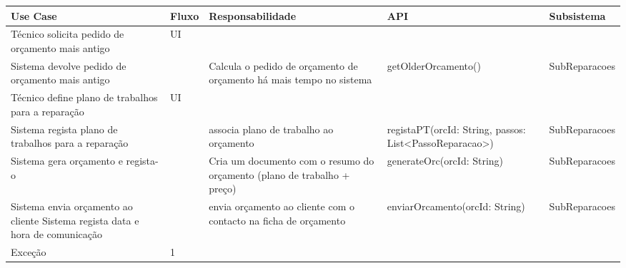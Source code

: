 \documentclass[../relatorio.tex]{subfiles}
\begin{document}
\begin{landscape}
    \begin{table}[!h]
        \centering
        \begin{tabular}{|p{5cm}|p{1cm}|p{4cm}|p{6cm}|p{3cm}|}
            \hline
            \rowcolor{gray!20!white}
            Use Case & Fluxo & Responsabilidade & API & Subsistema \\
            \hline
            \rowcolor{yellow}
            Técnico solicita pedido de orçamento mais antigo
                     & 
            UI
                     & 
                     & 
                     & 
            \\
            \hline
            Sistema devolve pedido de orçamento mais antigo
                     & 
                     & 
            Calcula o pedido de orçamento de orçamento há mais tempo no sistema
                     & 
            getOlderOrcamento()
                     & 
            SubReparacoes
            \\
            \hline
            \rowcolor{yellow}
            Técnico define plano de trabalhos para a reparação
                     & 
            UI 
                     & 
                     & 
                     & 
            \\
            \hline
            Sistema regista plano de trabalhos para a reparação
                     & 
                     & 
            associa plano de trabalho ao orçamento
                     & 
            registaPT(orcId: String, passos: List<PassoReparacao>)
                     & 
            SubReparacoes
            \\
            \hline
            Sistema gera orçamento e regista-o
                     & 
                     & 
            Cria um documento com o resumo do orçamento (plano de trabalho + preço)
                     & 
            generateOrc(orcId: String)
                     & 
            SubReparacoes
            \\
            \hline
            Sistema envia orçamento ao cliente
            Sistema regista data e hora de comunicação
                     & 
                     & 
            envia orçamento ao cliente com o contacto na ficha de orçamento
                     & 
            enviarOrcamento(orcId: String)
                     & 
            SubReparacoes
            \\
            \hline
            \rowcolor{red!30}
            Exceção
                     & 
            1 
                     & 

\end{tabular}
\end{table}
\end{landscape}
\end{document}
